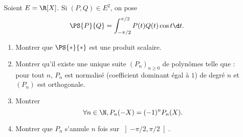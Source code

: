 \begin{enonce}
\begin{exercise}[ID={RMS122 E941},subtitle={Oral Centrale PSI 2011},tags={mpsi}]
Soient $E=\R[X]$.
Si $(P,Q)\in E^2$, on pose 
\begin{equation*}
  \PS{P}{Q}=\int_{-\pi/2}^{\pi/2} P(t)Q(t)\cos t\d t.
\end{equation*}
\begin{enumerate}
  \item Montrer que $\PS{*}{*}$ est une produit scalaire.
  \item Montrer qu'il existe une unique suite $(P_n)_{n\geq0}$ de polynômes telle que : pour tout $n$, $P_n$ est normalisé (coefficient dominant égal à $1$) de degré $n$ et $(P_n)$ est orthogonale.
  \item Montrer
    \begin{equation*}
      \forall n\in\N, P_n(-X)=(-1)^n P_n(X).
    \end{equation*}
\item Montrer que $P_n$ s'annule $n$ fois sur $\left]-\pi/2,\pi/2\right[$.
\end{enumerate}
\end{exercise}
\begin{solution}
\end{solution}
\end{enonce}
